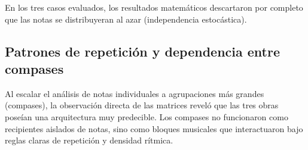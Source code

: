 \documentclass{article}
\theoremstyle{plain}
\theoremstyle{definition}
\begin{document}

En los tres casos evaluados, los resultados matemáticos descartaron por completo que las notas se distribuyeran al azar (independencia estocástica).

\subsection*{Patrones de repetición y dependencia entre compases}

Al escalar el análisis de notas individuales a agrupaciones más grandes (compases), la observación directa de las matrices reveló que las tres obras poseían una arquitectura muy predecible. Los compases no funcionaron como recipientes aislados de notas, sino como bloques musicales que interactuaron bajo reglas claras de repetición y densidad rítmica.
\end{document}

